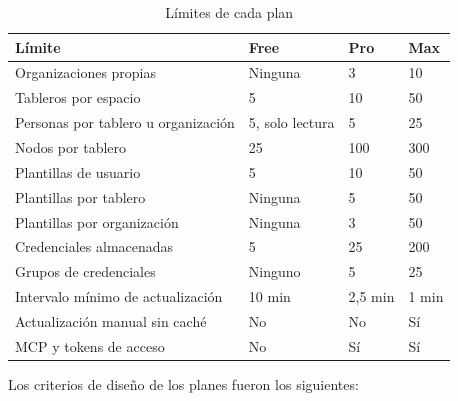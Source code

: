 \begin{table}[H]
  \centering
  \renewcommand{\arraystretch}{1.2}
  \begin{tabularx}{\textwidth}{X l l l}
    \toprule
    Límite & Free & Pro & Max \\
    \midrule
    Organizaciones propias & Ninguna & 3 & 10 \\
    Tableros por espacio & 5 & 10 & 50 \\
    Personas por tablero u organización & 5, solo lectura & 5 & 25 \\
    Nodos por tablero & 25 & 100 & 300 \\
    Plantillas de usuario & 5 & 10 & 50 \\
    Plantillas por tablero & Ninguna & 5 & 50 \\
    Plantillas por organización & Ninguna & 3 & 50 \\
    Credenciales almacenadas & 5 & 25 & 200 \\
    Grupos de credenciales & Ninguno & 5 & 25 \\
    Intervalo mínimo de actualización & 10 min & 2,5 min & 1 min \\
    Actualización manual sin caché & No & No & Sí \\
    MCP y tokens de acceso & No & Sí & Sí \\
    \bottomrule
  \end{tabularx}
  \caption{Límites de cada plan}
  \label{tab:planes_limites}
\end{table}

Los criterios de diseño de los planes fueron los siguientes:


